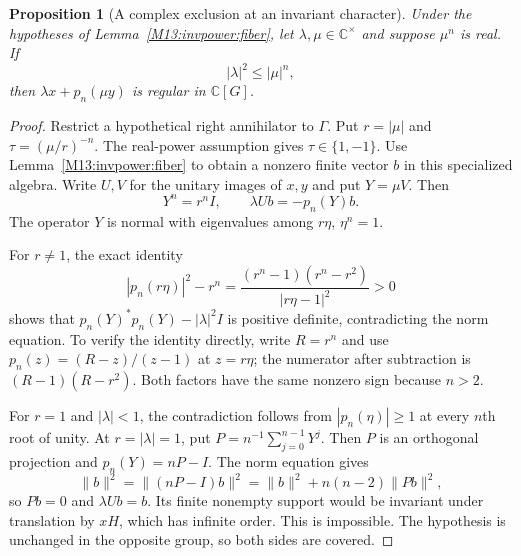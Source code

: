 \documentclass[11pt,a4paper,oneside]{report}
\newtheorem{proposition}[theorem]{Proposition}
\theoremstyle{definition}
\theoremstyle{remark}
\newcommand{\C}{\mathbb C}
\begin{document}
\begin{proposition}[A complex exclusion at an invariant character]
\label{M13:invpower:complex}
Under the hypotheses of Lemma~\ref{M13:invpower:fiber}, let
$\lambda,\mu\in\C^\times$ and suppose $\mu^n$ is real.
If
\[
 |\lambda|^2\le |\mu|^n,
\]
then $\lambda x+p_n(\mu y)$ is regular in $\C[G]$.
\end{proposition}
\begin{proof}
Restrict a hypothetical right annihilator to $\Gamma$.
Put $r=|\mu|$ and $\tau=(\mu/r)^{-n}$.
The real-power assumption gives $\tau\in\{1,-1\}$.
Use Lemma~\ref{M13:invpower:fiber} to obtain a nonzero finite vector
$b$ in this specialized algebra. Write $U,V$ for the unitary
images of $x,y$ and put $Y=\mu V$. Then
\[
 Y^n=r^nI,\qquad \lambda Ub=-p_n(Y)b.
\]
The operator $Y$ is normal with eigenvalues among
$r\eta$, $\eta^n=1$.

For $r\ne1$, the exact identity
\begin{equation}\label{M13:invpower:radial}
 |p_n(r\eta)|^2-r^n
 =\frac{(r^n-1)(r^n-r^2)}{|r\eta-1|^2}>0
\end{equation}
shows that $p_n(Y)^*p_n(Y)-|\lambda|^2I$ is positive definite,
contradicting the norm equation. To verify the identity directly,
write $R=r^n$ and use $p_n(z)=(R-z)/(z-1)$ at $z=r\eta$;
the numerator after subtraction is $(R-1)(R-r^2)$.
Both factors have the same nonzero sign because $n>2$.

For $r=1$ and $|\lambda|<1$, the contradiction follows from
$|p_n(\eta)|\ge1$ at every $n$th root of unity.
At $r=|\lambda|=1$, put
$P=n^{-1}\sum_{j=0}^{n-1}Y^j$.
Then $P$ is an orthogonal projection and $p_n(Y)=nP-I$.
The norm equation gives
\[
 \|b\|^2=\|(nP-I)b\|^2
 =\|b\|^2+n(n-2)\|Pb\|^2,
\]
so $Pb=0$ and $\lambda Ub=b$.
Its finite nonempty support would be invariant under translation
by $xH$, which has infinite order. This is impossible.
The hypothesis is unchanged in the opposite group, so both sides
are covered.
\end{proof}
\end{document}
